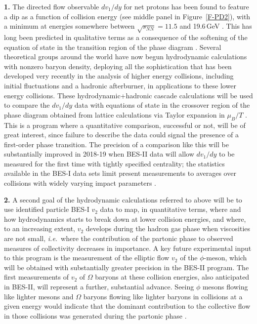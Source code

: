 {\bf 1.} The directed flow observable $dv_1/dy$ for net protons has been 
found to feature a dip as a function of collision energy (see middle panel 
in Figure~\ref{F-PD2}), with a minimum at energies somewhere between 
$\sqrt{s_{NN}}=11.5$ and 19.6\,GeV \cite{Adamczyk:2014ipa}. This has 
long been predicted in qualitative terms as a consequence of the 
softening of the equation of state in the transition region of the phase 
diagram \cite{Brachmann:1999mp,Stoecker:2004qu}. Several theoretical 
groups around the world have now begun hydrodynamic calculations with 
nonzero baryon density, deploying all the sophistication that has been
developed very recently in the analysis of higher energy collisions,
including initial fluctuations and a hadronic afterburner, in
applications to these lower energy collisions. These
hydrodynamic+hadronic cascade calculations will be used to compare the
$dv_1/dy$ data with equations of state in the crossover region of the
phase diagram obtained from lattice calculations via Taylor expansion
in $\mu_B/T$ \cite{Huovinen:2014woa}. This is a program where a
quantitative comparison, successful or not, will be of great interest,
since failure to describe the data could signal the presence of a
first-order phase transition. The precision of a comparison like this
will be substantially improved in 2018-19 when BES-II data will allow
$dv_1/dy$ to be measured for the first time with tightly specified
centrality; the statistics available in the BES-I data sets limit
present measurements to averages over collisions with widely varying
impact parameters \cite{Adamczyk:2014ipa}.

{\bf 2.} A second goal of the hydrodynamic calculations referred to
above will be to use identified particle BES-I $v_2$ data to map, in
quantitative terms, where and how hydrodynamics starts to break down
at lower collision energies, and where, to an increasing extent, $v_2$
develops during the hadron gas phase when viscosities are not small,
{\it i.e.}~where the contribution of the partonic phase to observed measures
of collectivity decreases in importance. A key future experimental
input to this program is the measurement of the elliptic flow $v_2$ of
the $\phi$-meson, which will be obtained with substantially greater
precision in the BES-II program. The first measurements of $v_2$ of
$\Omega$ baryons at these collision energies, also anticipated in
BES-II, will represent a further, substantial advance. Seeing $\phi$
mesons flowing like lighter mesons and $\Omega$ baryons flowing like
lighter baryons in collisions at a given energy would indicate that
the dominant contribution to the collective flow in those collisions
was generated during the partonic phase \cite{Abelev:2007rw}.


